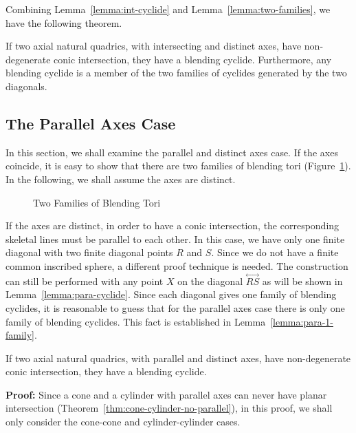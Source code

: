     Combining Lemma~\ref{lemma:int-cyclide} and Lemma~\ref{lemma:two-families},
we have the following theorem.

\begin{theorem}
\label{thm:cyclide<->planar-nondegen}
     If two axial natural quadrics, with intersecting and distinct axes, have
non-degenerate conic intersection, they have a blending cyclide.
Furthermore, any blending cyclide is a member of the two families of
cyclides generated by the two diagonals.
\end{theorem}


\subsection{The Parallel Axes Case}
\label{section:cyc:parallel-axes}

     In this section, we shall examine the parallel and distinct axes case.  
If the axes coincide, it is easy to show that there are two families of
blending tori (Figure~\ref{fig:blending-tori}).
In the following, we shall assume the axes are distinct.
\begin{figure}
\vspace{6.5cm}
\caption{Two Families of Blending Tori}
\label{fig:blending-tori}
\end{figure}

     If the axes are distinct, in order to have a conic intersection, the 
corresponding skeletal lines must be parallel to each other.  In this case, we 
have only one finite diagonal with two finite diagonal points $R$ and $S$.  
Since we do not have a finite common inscribed sphere, a different proof
technique is needed.  The construction can still be performed with any point 
$X$ on the diagonal $\stackrel{\longleftrightarrow}{RS}$ as will be shown in 
Lemma~\ref{lemma:para-cyclide}.  Since each diagonal gives
one family of blending cyclides, it is reasonable to guess that for the
parallel axes case there is only one family of blending cyclides.
This fact is established in Lemma~\ref{lemma:para-1-family}.

\begin{lemma}
\label{lemma:para-cyclide}
     If two axial natural quadrics, with parallel and distinct axes, 
have non-degenerate conic intersection, they have a blending cyclide.
\end{lemma}
{\bf Proof:}  Since a cone and a cylinder with parallel axes can never have
planar intersection (Theorem~\ref{thm:cone-cylinder-no-parallel}),
in this proof, we shall only consider the cone-cone and 
cylinder-cylinder cases.

